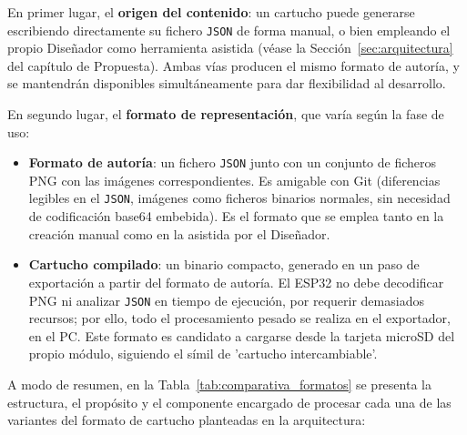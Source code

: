 \documentclass[../main.tex]{subfiles}
\begin{document}
	En primer lugar, el \textbf{origen del contenido}: un cartucho puede generarse escribiendo directamente su fichero \texttt{JSON} de forma manual, o bien empleando el propio Diseñador como herramienta asistida (véase la Sección~\ref{sec:arquitectura} del capítulo de Propuesta). Ambas vías producen el mismo formato de autoría, y se mantendrán disponibles simultáneamente para dar flexibilidad al desarrollo.

	En segundo lugar, el \textbf{formato de representación}, que varía según la fase de uso:

	\begin{itemize}
		\item \textbf{Formato de autoría}: un fichero \texttt{JSON} junto con un conjunto de ficheros PNG con las imágenes correspondientes. Es amigable con Git (diferencias legibles en el \texttt{JSON}, imágenes como ficheros binarios normales, sin necesidad de codificación base64 embebida). Es el formato que se emplea tanto en la creación manual como en la asistida por el Diseñador.
		\item \textbf{Cartucho compilado}: un binario compacto, generado en un paso de exportación a partir del formato de autoría. El ESP32 no debe decodificar PNG ni analizar \texttt{JSON} en tiempo de ejecución, por requerir demasiados recursos; por ello, todo el procesamiento pesado se realiza en el exportador, en el PC. Este formato es candidato a cargarse desde la tarjeta microSD del propio módulo, siguiendo el símil de 'cartucho intercambiable'.
	\end{itemize}

A modo de resumen, en la Tabla~\ref{tab:comparativa_formatos} se presenta la estructura, el propósito y el componente encargado de procesar cada una de las variantes del formato de cartucho planteadas en la arquitectura:
\end{document}
